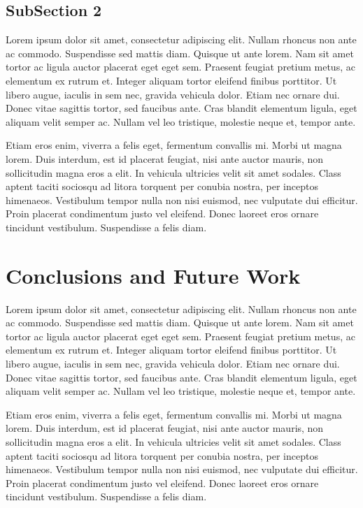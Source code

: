\documentclass[letterpaper]{article}
\begin{document}
\subsection{SubSection 2}
Lorem ipsum dolor sit amet, consectetur adipiscing elit. Nullam rhoncus non ante ac commodo. Suspendisse sed mattis diam. Quisque ut ante lorem. Nam sit amet tortor ac ligula auctor placerat eget eget sem. Praesent feugiat pretium metus, ac elementum ex rutrum et. Integer aliquam tortor eleifend finibus porttitor. Ut libero augue, iaculis in sem nec, gravida vehicula dolor. Etiam nec ornare dui. Donec vitae sagittis tortor, sed faucibus ante. Cras blandit elementum ligula, eget aliquam velit semper ac. Nullam vel leo tristique, molestie neque et, tempor ante.

Etiam eros enim, viverra a felis eget, fermentum convallis mi. Morbi ut magna lorem. Duis interdum, est id placerat feugiat, nisi ante auctor mauris, non sollicitudin magna eros a elit. In vehicula ultricies velit sit amet sodales. Class aptent taciti sociosqu ad litora torquent per conubia nostra, per inceptos himenaeos. Vestibulum tempor nulla non nisi euismod, nec vulputate dui efficitur. Proin placerat condimentum justo vel eleifend. Donec laoreet eros ornare tincidunt vestibulum. Suspendisse a felis diam.
\section{Conclusions and Future Work}
Lorem ipsum dolor sit amet, consectetur adipiscing elit. Nullam rhoncus non ante ac commodo. Suspendisse sed mattis diam. Quisque ut ante lorem. Nam sit amet tortor ac ligula auctor placerat eget eget sem. Praesent feugiat pretium metus, ac elementum ex rutrum et. Integer aliquam tortor eleifend finibus porttitor. Ut libero augue, iaculis in sem nec, gravida vehicula dolor. Etiam nec ornare dui. Donec vitae sagittis tortor, sed faucibus ante. Cras blandit elementum ligula, eget aliquam velit semper ac. Nullam vel leo tristique, molestie neque et, tempor ante.

Etiam eros enim, viverra a felis eget, fermentum convallis mi. Morbi ut magna lorem. Duis interdum, est id placerat feugiat, nisi ante auctor mauris, non sollicitudin magna eros a elit. In vehicula ultricies velit sit amet sodales. Class aptent taciti sociosqu ad litora torquent per conubia nostra, per inceptos himenaeos. Vestibulum tempor nulla non nisi euismod, nec vulputate dui efficitur. Proin placerat condimentum justo vel eleifend. Donec laoreet eros ornare tincidunt vestibulum. Suspendisse a felis diam.




\end{document}
